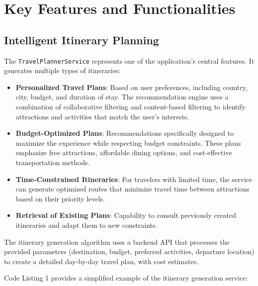 \documentclass[11pt, a4paper]{article}
\begin{document}
\section{Key Features and Functionalities}

\subsection{Intelligent Itinerary Planning}

The \texttt{TravelPlannerService} represents one of the application's central features. It generates multiple types of itineraries:

\begin{itemize}
    \item \textbf{Personalized Travel Plans}: Based on user preferences, including country, city, budget, and duration of stay. The recommendation engine uses a combination of collaborative filtering and content-based filtering to identify attractions and activities that match the user's interests.
    
    \item \textbf{Budget-Optimized Plans}: Recommendations specifically designed to maximize the experience while respecting budget constraints. These plans emphasize free attractions, affordable dining options, and cost-effective transportation methods.
    
    \item \textbf{Time-Constrained Itineraries}: For travelers with limited time, the service can generate optimized routes that minimize travel time between attractions based on their priority levels.
    
    \item \textbf{Retrieval of Existing Plans}: Capability to consult previously created itineraries and adapt them to new constraints.
\end{itemize}

The itinerary generation algorithm uses a backend API that processes the provided parameters (destination, budget, preferred activities, departure location) to create a detailed day-by-day travel plan, with cost estimates.

Code Listing 1 provides a simplified example of the itinerary generation service:
\end{document}
